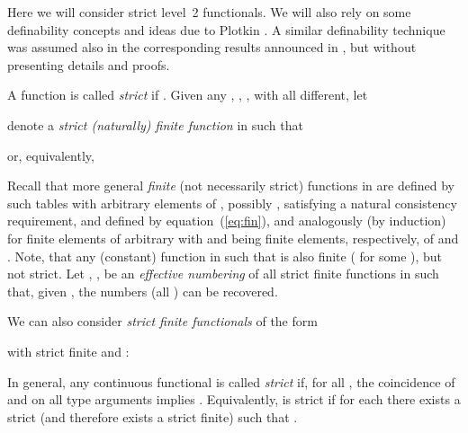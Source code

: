 \documentclass[fleqn]{LMCS}
\theoremstyle{plain}\newtheorem{satz}[thm]{Satz}
\theoremstyle{plain}\newtheorem{hyp}[thm]{Hypothesis}
\theoremstyle{plain}\newtheorem{hyps}[thm]{Hypotheses}
\theoremstyle{definition}\newtheorem{note}[thm]{Note}
\newcommand{\arr}{\rightarrow}
\newcommand{\?}{\mbox{?}}
\begin{document}
\noindent
Here we will consider strict level~2 functionals. 
We will also rely on some definability concepts 
and ideas due to Plotkin \cite{Plotkin77}.  
A similar definability technique was assumed also in 
the corresponding results announced in 
\cite{Saz76d,Saz76AL}, but without 
presenting details and proofs. 

A function  is called \emph{strict} if 
.
Given any 
,  
, , with all  different, 
let 

denote a \emph{strict (naturally) finite function} in  
such that 

or, equivalently, 

Recall that more general \emph{finite} (not necessarily strict) functions 
in  are defined by such tables with 
 arbitrary elements of , possibly , 
satisfying 
a natural consistency requirement, and defined by equation~(\ref{eq:fin}), 
and analogously (by induction) for finite elements of 
arbitrary  with 
 and  being finite elements, respectively, 
of  and . 
Note, that any (constant) function in  
such that  is also 
finite ( for some ), but not strict. 
Let , , be an \emph{effective numbering} of all 
strict finite functions in  
such that, given , the numbers  (all ) can be recovered. 

We can also consider \emph{strict finite functionals} of the form 
 
with  strict finite and :
 
In general, any continuous functional  is 
called \emph{strict} if, 
for all \iota\arr\iota, the coincidence of  and  
on all type  
arguments  implies . 
Equivalently,  is strict if for each  
there exists a strict (and therefore exists a strict finite) 
 such that . 
\end{document}
